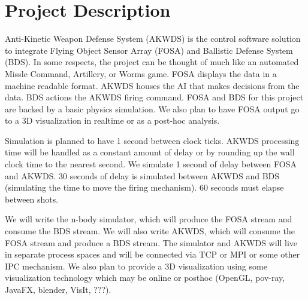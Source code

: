 \chapter*{Project Description}
Anti-Kinetic Weapon Defense System (AKWDS) is the control software solution to integrate Flying Object Sensor Array (FOSA) and Ballistic Defense System (BDS). In some respects, the project can be thought of much like an automated Missle Command, Artillery, or Worms game. FOSA displays the data in a machine readable format. AKWDS houses the AI that makes decisions from the data. BDS actions the AKWDS firing command. FOSA and BDS for this project are backed by a basic physics simulation. We also plan to have FOSA output go to a 3D visualization in realtime or as a post-hoc analysis.

Simulation is planned to have 1 second between clock ticks. AKWDS processing time will be handled as a constant amount of delay or by rounding up the wall clock time to the nearest second. We simulate 1 second of delay between FOSA and AKWDS. 30 seconds of delay is simulated between AKWDS and BDS (simulating the time to move the firing mechanism). 60 seconds must elapse between shots.

We will write the n-body simulator, which will produce the FOSA stream and consume the BDS stream. We will also write AKWDS, which will consume the FOSA stream and produce a BDS stream. The simulator and AKWDS will live in separate process spaces and will be connected via TCP or MPI or some other IPC mechanism. We also plan to provide a 3D visualization using some visualization technology which may be online or posthoc (OpenGL, pov-ray, JavaFX, blender, VisIt, ???).
